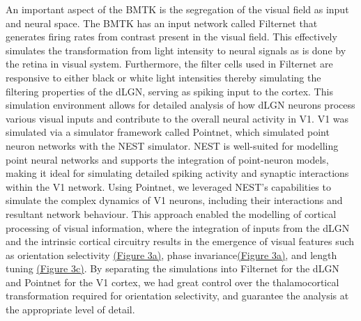 \documentclass[12pt]{article}
\begin{document}
An important aspect of the BMTK is the segregation of the visual field as input and neural space. The BMTK has an input network called Filternet that generates firing rates from contrast present in the visual field. This effectively simulates the transformation from light intensity to neural signals as is done by the retina in visual system. Furthermore, the filter cells used in Filternet are responsive to either black or white light intensities thereby simulating the filtering properties of the dLGN, serving as spiking input to the cortex. This simulation environment allows for detailed analysis of how dLGN neurons process various visual inputs and contribute to the overall neural activity in V1. V1 was simulated via a simulator framework called Pointnet, which simulated point neuron networks with the NEST simulator. NEST is well-suited for modelling point neural networks and supports the integration of point-neuron models, making it ideal for simulating detailed spiking activity and synaptic interactions within the V1 network. Using Pointnet, we leveraged NEST's capabilities to simulate the complex dynamics of V1 neurons, including their interactions and resultant network behaviour. This approach enabled the modelling of cortical processing of visual information, where the integration of inputs from the dLGN and the intrinsic cortical circuitry results in the emergence of visual features such as orientation selectivity \hyperref[fig:LIF_Overview]{(Figure 3a)}, phase invariance\hyperref[fig:LIF_Overview]{(Figure 3a)}, and length tuning \hyperref[fig:LIF_Overview]{(Figure 3c)}. By separating the simulations into Filternet for the dLGN and Pointnet for the V1 cortex, we had great control over the thalamocortical transformation required for orientation selectivity, and guarantee the analysis at the appropriate level of detail.
\bigbreak
\end{document}
